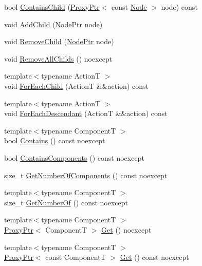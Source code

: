 \begin{DoxyCompactItemize}
bool \mbox{\hyperlink{classmage_1_1_node_a2c1d85609b765c019a0a123f5f8a182a}{Contains\+Child}} (\mbox{\hyperlink{classmage_1_1_proxy_ptr}{Proxy\+Ptr}}$<$ const \mbox{\hyperlink{classmage_1_1_node}{Node}} $>$ node) const
\item 
void \mbox{\hyperlink{classmage_1_1_node_ad2324a1a111548e4b80b8e4cbaba5221}{Add\+Child}} (\mbox{\hyperlink{classmage_1_1_node_ac575dc006e0ae1134277ade977dc06b6}{Node\+Ptr}} node)
\item 
void \mbox{\hyperlink{classmage_1_1_node_a0654443d58730ebc7471626a38c2bc7f}{Remove\+Child}} (\mbox{\hyperlink{classmage_1_1_node_ac575dc006e0ae1134277ade977dc06b6}{Node\+Ptr}} node)
\item 
void \mbox{\hyperlink{classmage_1_1_node_a601804f7da1df59d5f0bd91a68dc7282}{Remove\+All\+Childs}} () noexcept
\item 
{\footnotesize template$<$typename ActionT $>$ }\\void \mbox{\hyperlink{classmage_1_1_node_a3e3e68660b1626caf160723f17113669}{For\+Each\+Child}} (ActionT \&\&action) const
\item 
{\footnotesize template$<$typename ActionT $>$ }\\void \mbox{\hyperlink{classmage_1_1_node_ad327e0c58c9d72026b233b0df4f82929}{For\+Each\+Descendant}} (ActionT \&\&action) const
\item 
{\footnotesize template$<$typename ComponentT $>$ }\\bool \mbox{\hyperlink{classmage_1_1_node_ab3defd7329e8f87cff65cd8136c8f2d2}{Contains}} () const noexcept
\item 
bool \mbox{\hyperlink{classmage_1_1_node_aafb492896751b5b60ba5ddaeecbdd719}{Contains\+Components}} () const noexcept
\item 
size\+\_\+t \mbox{\hyperlink{classmage_1_1_node_a51d74c74f31d8fcbc0cf6768fd180a8e}{Get\+Number\+Of\+Components}} () const noexcept
\item 
{\footnotesize template$<$typename ComponentT $>$ }\\size\+\_\+t \mbox{\hyperlink{classmage_1_1_node_a0cd486de1639d5af2618ba913124fbe6}{Get\+Number\+Of}} () const noexcept
\item 
{\footnotesize template$<$typename ComponentT $>$ }\\\mbox{\hyperlink{classmage_1_1_proxy_ptr}{Proxy\+Ptr}}$<$ ComponentT $>$ \mbox{\hyperlink{classmage_1_1_node_af514b0282820f1d071fc24a2b815ae82}{Get}} () noexcept
\item 
{\footnotesize template$<$typename ComponentT $>$ }\\\mbox{\hyperlink{classmage_1_1_proxy_ptr}{Proxy\+Ptr}}$<$ const ComponentT $>$ \mbox{\hyperlink{classmage_1_1_node_a597f86bd9faecda719c37c4b2c73231e}{Get}} () const noexcept

\end{DoxyCompactItemize}

